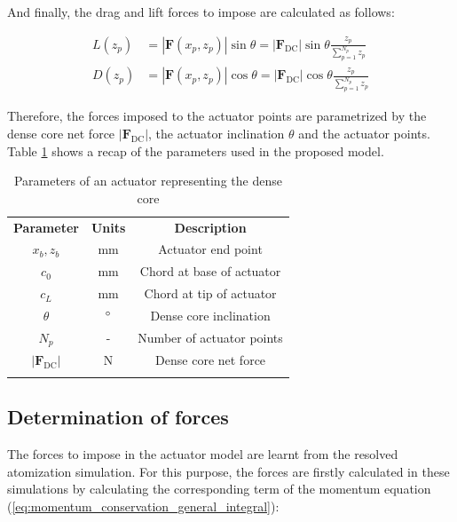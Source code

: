 And finally, the drag and lift forces to impose are calculated as follows:

\begin{subequations}
\label{eq:ALM_lift_drag_definitions}
\begin{align}
L \left( z_p \right) &= |\textbf{F} \left( x_p, z_p \right) | \sin \theta = | \textbf{F}_\mathrm{DC} | \sin \theta \frac{z_p}{\sum_{p=1}^{N_p} z_p} \\
D \left( z_p \right) &= |\textbf{F} \left( x_p, z_p \right) | \cos \theta = | \textbf{F}_\mathrm{DC} | \cos \theta \frac{z_p}{\sum_{p=1}^{N_p} z_p}
\end{align}
\end{subequations}

Therefore, the forces imposed to the actuator points are parametrized by the dense core net force $| \textbf{F}_\mathrm{DC} |$, the actuator inclination $\theta$ and the actuator points. Table \ref{tab:alm_parameters} shows a recap of the parameters used in the proposed model. %

\begin{table}[!h]
\centering
\caption{Parameters of an actuator representing the dense core}
\begin{tabular}{ccc}
\thickhline
\textbf{Parameter} & \textbf{Units} & \textbf{Description} \\ 
\thickhline
$x_b, z_b$ & mm & Actuator end point  \\
$c_0$ & mm & Chord at base of actuator \\
$c_L$ & mm & Chord at tip of actuator \\
$\theta$ & $\degree$ & Dense core inclination  \\
$N_p$ & - & Number of actuator points \\
$| \textbf{F}_\mathrm{DC} |$ & N & Dense core net force\\
\thickhline 
\end{tabular}
\label{tab:alm_parameters}
\end{table}


\subsection{Determination of forces}

The forces to impose in the actuator model are learnt from the resolved atomization simulation. For this purpose, the forces are firstly calculated in these simulations by calculating the corresponding term of the momentum equation (\ref{eq:momentum_conservation_general_integral}):

